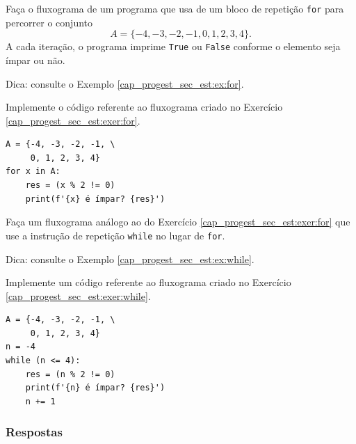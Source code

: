 \begin{exer}\label{cap_progest_sec_est:exer:for}
  Faça o fluxograma de um programa que usa de um bloco de repetição \lstinline+for+ para percorrer o conjunto
  \begin{equation}
    A = \{-4, -3, -2, -1, 0, 1, 2, 3, 4\}.
  \end{equation}
  A cada iteração, o programa imprime \lstinline+True+ ou \lstinline+False+ conforme o elemento seja ímpar ou não.
\end{exer}
\begin{resp}
  Dica: consulte o Exemplo \ref{cap_progest_sec_est:ex:for}.
\end{resp}

\begin{exer}
  Implemente o código referente ao fluxograma criado no Exercício \ref{cap_progest_sec_est:exer:for}.
\end{exer}
\begin{resp}

\begin{lstlisting}
A = {-4, -3, -2, -1, \
     0, 1, 2, 3, 4}
for x in A:
    res = (x % 2 != 0)
    print(f'{x} é ímpar? {res}')
\end{lstlisting}

\end{resp}

\begin{exer}\label{cap_progest_sec_est:exer:while}
  Faça um fluxograma análogo ao do Exercício \ref{cap_progest_sec_est:exer:for} que use a instrução de repetição \lstinline+while+ no lugar de \lstinline+for+.
\end{exer}
\begin{resp}
  Dica: consulte o Exemplo \ref{cap_progest_sec_est:ex:while}.
\end{resp}

\begin{exer}
  Implemente um código referente ao fluxograma criado no Exercício \ref{cap_progest_sec_est:exer:while}.
\end{exer}
\begin{resp}

\begin{lstlisting}
A = {-4, -3, -2, -1, \
     0, 1, 2, 3, 4}
n = -4
while (n <= 4):
    res = (n % 2 != 0)
    print(f'{n} é ímpar? {res}')
    n += 1
\end{lstlisting}

\end{resp}

\ifisbook
\subsubsection{Respostas}
\shipoutAnswer
\fi


